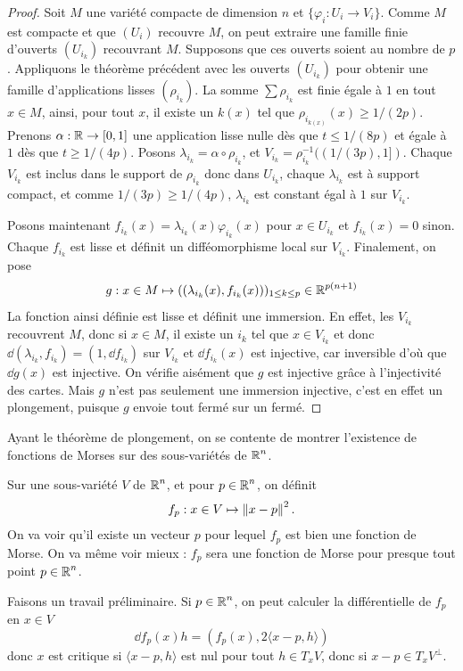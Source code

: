 \begin{proof}
    Soit $M$ une variété compacte de dimension $n$ et $\lbrace\varphi_i:U_i\to V_i\rbrace$. 
    Comme $M$ est compacte et que $(U_i)$ recouvre $M$, on peut extraire une famille finie 
    d'ouverts $(U_{i_k})$ recouvrant $M$. 
    Supposons que ces ouverts soient au nombre de $p$.
    Appliquons le théorème précédent avec les ouverts $(U_{i_k})$ pour obtenir une famille 
    d'applications lisses $(\rho_{i_k})$.
    La somme $\sum\rho_{i_k}$ est finie égale à $1$ en tout $x\in M$, ainsi, pour tout $x$, 
    il existe un $k(x)$ tel que $\rho_{i_{k(x)}}(x)\geq1/(2p)$.
    Prenons $\alpha:\operatorname{\mathbb R}\to[0,1]$ une application lisse nulle dès que $t\leq 1/(8p)$ et égale 
    à $1$ dès que $t\geq 1/(4p)$.
    Posons $\lambda_{i_k}=\alpha\circ\rho_{i_k}$, et $V_{i_k}=\rho_{i_k}^{-1}((1/(3p),1])$.
    Chaque $V_{i_k}$ est inclus dans le support de $\rho_{i_k}$ donc dans $U_{i_k}$, chaque 
    $\lambda_{i_k}$ est à support compact, et comme $1/(3p)\geq1/(4p)$, $\lambda_{i_k}$ est 
    constant égal à $1$ sur $V_{i_k}$.


    Posons maintenant $f_{i_k}(x)=\lambda_{i_k}(x)\varphi_{i_k}(x)$ pour $x\in U_{i_k}$ et 
    $f_{i_k}(x)=0$ sinon.
    Chaque $f_{i_k}$ est lisse et définit un difféomorphisme local sur $V_{i_k}$. 
    Finalement, on pose 
    \[
        g:x\in M\mapsto ((\lambda_{i_k}(x),f_{i_k}(x)))_{1\leq k\leq p}\in\operatorname{\mathbb R}^{p(n+1)}
    \]
    La fonction ainsi définie est lisse et définit une immersion. 
    En effet, les $V_{i_k}$ recouvrent $M$, donc si $x\in M$, il existe un $i_k$ tel 
    que $x\in V_{i_k}$ et donc $\dd(\lambda_{i_k},f_{i_k})=(1,\dd f_{i_k})$ sur $V_{i_k}$ 
    et $\dd f_{i_k}(x)$ est injective, car inversible d'où que $\dd g(x)$ est injective. 
    On vérifie aisément que $g$ est injective grâce à l'injectivité des cartes.
    Mais $g$ n'est pas seulement une immersion injective, c'est en effet un plongement,
    puisque $g$ envoie tout fermé sur un fermé.
\end{proof}

Ayant le théorème de plongement, on se contente de montrer l'existence de fonctions de Morses 
sur des sous-variétés de $\operatorname{\mathbb R}^n$.

Sur une sous-variété $V$ de $\operatorname{\mathbb R}^n$, et pour $p\in\operatorname{\mathbb R}^n$, on définit 
\[
    f_p:x\in V\mapsto \left\lVert x-p\right\rVert^2.
\]
On va voir qu'il existe un vecteur $p$ pour lequel $f_p$ est bien une fonction de Morse. 
On va même voir mieux : $f_p$ sera une fonction de Morse pour presque tout point $p\in\operatorname{\mathbb R}^n$.

Faisons un travail préliminaire. Si $p\in\operatorname{\mathbb R}^n$, on peut calculer la différentielle de $f_p$ en 
$x\in V$
\[
    \dd f_p(x)h=(f_p(x),2\langle x-p,h\rangle)
\]
donc $x$ est critique si $\langle x-p,h\rangle$ est nul pour tout $h\in T_xV$, donc si 
$x-p\in T_xV^\bot$.

